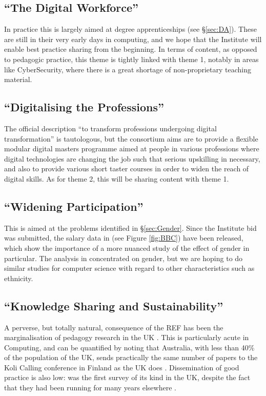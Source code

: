 \documentclass[sigconf,anonymous]{acmart}
\begin{document}
\subsection{``The Digital Workforce''}

In practice this is largely aimed at degree apprenticeships (see
\S\ref{sec:DA}). These are still in their very early days in
computing, and we hope that the Institute will enable best practice
sharing from the beginning. In terms of content, as opposed to
pedagogic practice, this theme is tightly linked with theme 1, notably
in areas like CyberSecurity, where there is a great shortage of
non-proprietary teaching material.

\subsection{``Digitalising the Professions''}

The official description ``to transform professions undergoing digital
transformation'' \cite{DfE2018a} is tautologous, but the consortium
aims are to provide a flexible modular digital masters programme aimed
at people in various professions where digital technologies are
changing the job such that serious upskilling in necessary, and also
to provide various short taster courses in order to widen the reach of
digital skills. As for theme 2, this will be sharing content with theme 1.

\subsection{``Widening Participation''}

This is aimed at the problems identified in \S\ref{sec:Gender}. Since
the Institute bid was submitted, the salary data in \cite{DfE2018d}
(see Figure \ref{fig:BBC}) have been released, which show the
importance of a more nuanced study of the effect of gender in
particular. The analysis in \cite{DfE2018d} concentrated on gender,
but we are hoping to do similar studies for computer science with
regard to other characteristics such as ethnicity.

\subsection{``Knowledge Sharing and Sustainability''}

A perverse, but totally natural, consequence of the REF has been the
marginalisation of pedagogy research in the UK
\cite{Cottonetal2018a}. This is particularly acute in Computing, and
can be quantified by noting that Australia, with less than 40\% of the
population of the UK, sends practically the same number of papers to
the Koli Calling conference in Finland as the UK does
\cite{Simon2016a}. Dissemination of good practice is also low:
\cite{murphy-et-al:programming2017} was the first survey of its kind
in the UK, despite the fact that they had been running for many years
elsewhere \cite{simon-et-al:sigcse2018}.
\end{document}
